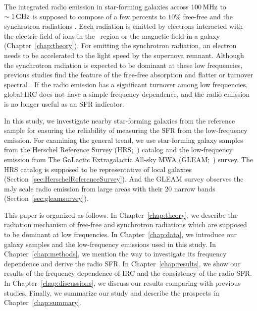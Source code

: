 The integrated radio emission in star-forming galaxies across $100\,\mathrm{MHz}$ to $\sim 1\,\mathrm{GHz}$ is supposed to compose of a few percents to $10\%$ free-free and the synchrotron radiations \citep{Condon1992a}.
Each radiation is emitted by electrons interacted with the electric field of ions in the \ih~region or the magnetic field in a galaxy (Chapter~\ref{chap:theory}).
For emitting the synchrotron radiation, an electron needs to be accelerated to the light speed by the supernova remnant.
Although the synchrotron radiation is expected to be dominant at these low frequencies, previous studies find the feature of the free-free absorption and flatter or turnover spectral \citep{Schober2017, Chyzy2018}.
If the radio emission has a significant turnover among low frequencies, global IRC does not have a simple frequency dependence, and the radio emission is no longer useful as an SFR indicator.

In this study, we investigate nearby star-forming galaxies from the reference sample for ensuring the reliability of measuring the SFR from the low-frequency emission.
For examining the general trend, we use star-forming galaxy samples from the Herschel Reference Survey (HRS;~\citealt{Boselli2010}) catalog and the low-frequency emission from The GaLactic Extragalactic All-sky MWA (GLEAM;~\citealt{Hurley-Walker2017a}) survey.
The HRS catalog is supposed to be representative of local galaxies (Section~\ref{sec:HerschelReferenceSurvey}).
And the GLEAM survey observes the mJy scale radio emission from large areas with their 20 narrow bands (Section~\ref{sec:gleamsurvey}).

This paper is organized as follows.
In Chapter~\ref{chap:theory}, we describe the radiation mechanism of free-free and synchrotron radiations which are supposed to be dominant at low frequencies.
In Chapter~\ref{chap:data}, we introduce our galaxy samples and the low-frequency emissions used in this study.
In Chapter~\ref{chap:methods}, we mention the way to investigate its frequency dependence and derive the radio SFR\@.
In Chapter~\ref{chap:results}, we show our results of the frequency dependence of IRC and the consistency of the radio SFR\@.
In Chapter~\ref{chap:discussions}, we discuss our results comparing with previous studies.
Finally, we summarize our study and describe the prospects in Chapter~\ref{chap:summary}.



